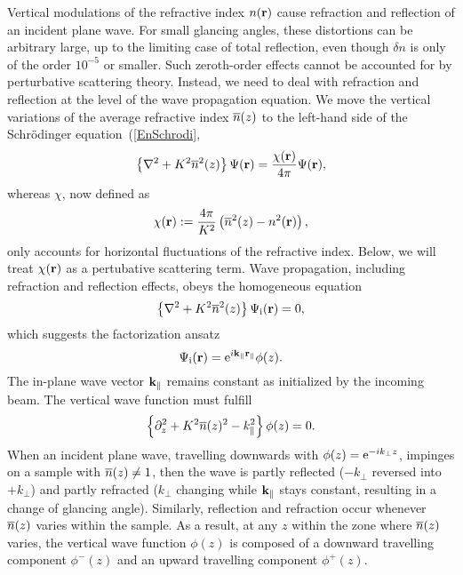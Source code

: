 Vertical modulations of the refractive index $n(\mathbf{r})$
cause refraction and reflection of an incident plane wave.
For small glancing angles,
these distortions can be arbitrary large,
up to the limiting case of total reflection,
even though $\delta n$ is only of the order $10^{-5}$ or smaller.
Such zeroth-order effects cannot be accounted for
by perturbative scattering theory.
Instead, we need to deal with refraction and reflection
at the level of the wave propagation equation.
We move the vertical variations of the average refractive index $\overline{n}(z)$
to the left-hand side of the Schrödinger equation~(\ref{EnSchrodi},
\begin{equation}\label{EHelmholtzGraded}
  \left\{\mathbf{\nabla}^2+K^2\overline{n}^2(z)\right\}\Psi(\mathbf{r})
  = \frac{\chi(\mathbf{r})}{4\pi}\Psi(\mathbf{r}),
\end{equation}
whereas $\chi$, now defined as
\begin{equation}\label{EChiGraded}
  \chi(\mathbf{r}) := \frac{4\pi}{K^2}\left(\overline{n}^2(z)-n^2(\mathbf{r})\right),
\end{equation}
only accounts for horizontal fluctuations of the refractive index.
Below, we will treat $\chi(\mathbf{r})$ as a pertubative scattering term.
Wave propagation, including refraction and reflection effects,
obeys the homogeneous equation
\begin{equation}\label{EHelmholtzGradedHomog}
  \left\{\mathbf{\nabla}^2+K^2\overline{n}^2(z)\right\}\Psi_\text{i}(\mathbf{r}) = 0,
\end{equation}
which suggests the factorization ansatz
\begin{equation}\label{Ewave3}
\Psi_\text{i}(\mathbf{r}) = {\rm e}^{i \mathbf{k}_\parallel\mathbf{r}_\parallel} \phi(z).
\end{equation}
The in-plane wave vector $\mathbf{k}_\parallel$ remains constant
as initialized by the incoming beam.
The vertical wave function must fulfill
\begin{equation}\label{Ewavez}
\left\{\partial_z^2 + K^2\overline{n}(z)^2 - k_\parallel^2 \right\} \phi(z) = 0.
\end{equation}
When an incident plane wave,
travelling downwards with
$\phi(z)={\rm e}^{-ik_\perp z}$,
impinges on a sample with $\overline{n}(z)\ne 1$,
then the wave is partly reflected ($-k_\perp$ reversed into $+k_\perp$)
and partly refracted
($k_\perp$ changing while $\mathbf{k}_\parallel$ stays constant,
resulting in a change of glancing angle).
Similarly, reflection and refraction occur
whenever $\overline{n}(z)$ varies within the sample.
As a result, at any $z$ within the zone where $\overline{n}(z)$ varies,
the vertical wave function $\phi(z)$ is composed of a
downward travelling component $\phi^-(z)$
and an upward travelling component $\phi^+(z)$.

